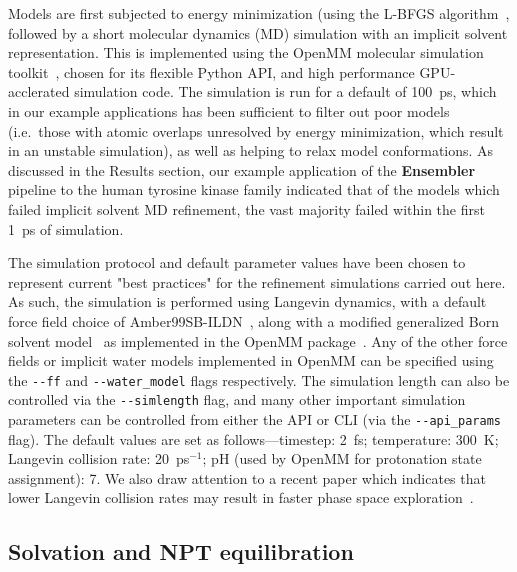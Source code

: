 \documentclass[aps,prl,preprint,nofootinbib,superscriptaddress,linenumbers]{revtex4-1}
\begin{document}
Models are first subjected to energy minimization (using the L-BFGS algorithm~\cite{lbfgs}, followed by a short molecular dynamics (MD) simulation with an implicit solvent representation.
This is implemented using the OpenMM molecular simulation toolkit~\cite{eastman:jctc:2012:openmm}, chosen for its flexible Python API, and high performance GPU-acclerated simulation code.
The simulation is run for a default of 100~ps, which in our example applications has been sufficient to filter out poor models (i.e.~those with atomic overlaps unresolved by energy minimization, which result in an unstable simulation), as well as helping to relax model conformations.
As discussed in the Results section, our example application of the {\bf Ensembler} pipeline to the human tyrosine kinase family indicated that of the models which failed implicit solvent MD refinement, the vast majority failed within the first 1~ps of simulation.

The simulation protocol and default parameter values have been chosen to represent current "best practices" for the refinement simulations carried out here.
As such, the simulation is performed using Langevin dynamics, with a default force field choice of Amber99SB-ILDN~\cite{amber99sb-ildn}, along with a modified generalized Born solvent model~\cite{gbsa-obc1} as implemented in the OpenMM package~\cite{eastman:jctc:2012:openmm}.
Any of the other force fields or implicit water models implemented in OpenMM can be specified using the {\tt -{}-ff} and {\tt -{}-water\_model} flags respectively.
The simulation length can also be controlled via the {\tt -{}-simlength} flag, and many other important simulation parameters can be controlled from either the API or CLI (via the {\tt -{}-api\_params} flag).
The default values are set as follows---timestep: 2~fs; temperature: 300~K; Langevin collision rate: 20~ps$^{-1}$; pH (used by OpenMM for protonation state assignment): 7.
We also draw attention to a recent paper which indicates that lower Langevin collision rates may result in faster phase space exploration~\cite{basconi:jctc:2013:collision-rates}.

\subsection{Solvation and NPT equilibration}
\end{document}
